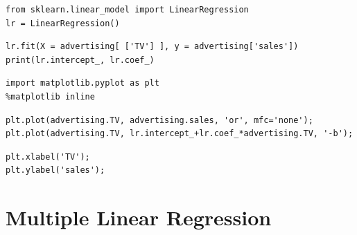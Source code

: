 \begin{frame}[fragile]
\tiny
\begin{lstlisting}
from sklearn.linear_model import LinearRegression
lr = LinearRegression()
\end{lstlisting}
\pause
\begin{lstlisting}
lr.fit(X = advertising[ ['TV'] ], y = advertising['sales'])
print(lr.intercept_, lr.coef_)
\end{lstlisting}
\pause
\begin{lstlisting}
import matplotlib.pyplot as plt
%matplotlib inline
\end{lstlisting}

\begin{lstlisting}
plt.plot(advertising.TV, advertising.sales, 'or', mfc='none');
plt.plot(advertising.TV, lr.intercept_+lr.coef_*advertising.TV, '-b');
\end{lstlisting}

\begin{lstlisting}
plt.xlabel('TV');
plt.ylabel('sales');
\end{lstlisting}

\end{frame}


\section{Multiple Linear Regression}



